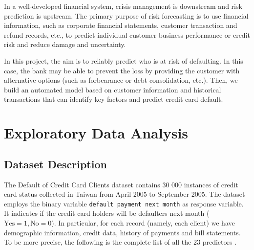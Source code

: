 \documentclass{article}
\begin{document}
In a well-developed financial system, crisis management is downstream and risk prediction is upstream. The primary purpose of risk forecasting is to use financial information, such as corporate financial statements, customer transaction and refund records, etc., to predict individual customer business performance or credit risk and reduce damage and uncertainty.

In this project, the aim is to reliably predict who is at risk of defaulting. In this case, the bank may be able to prevent the loss by providing the customer with alternative options (such as forbearance or debt consolidation, etc.). Then, we build an automated model based on customer information and historical transactions that can identify key factors and predict credit card default.

\newpage
\section{Exploratory Data Analysis}

\subsection{Dataset Description}

The Default of Credit Card Clients dataset contains 30 000 instances of credit card status collected in Taiwan from April 2005 to September 2005. The dataset employs the binary variable \texttt{default payment next month} as response variable. It indicates if the credit card holders will be defaulters next month ($\text{Yes}=1, \text{No}=0$).
In particular, for each record (namely, each client) we have demographic information, credit data, history of payments and bill statements. To be more precise, the following is the complete list of all the 23 predictors \cite{due}.
\end{document}

